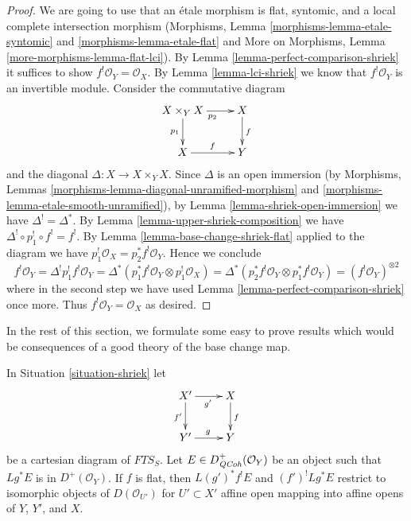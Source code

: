 \begin{proof}
We are going to use that an \'etale morphism is flat, syntomic,
and a local complete intersection morphism
(Morphisms, Lemma \ref{morphisms-lemma-etale-syntomic} and
\ref{morphisms-lemma-etale-flat} and
More on Morphisms, Lemma \ref{more-morphisms-lemma-flat-lci}).
By Lemma \ref{lemma-perfect-comparison-shriek} it suffices
to show $f^!\mathcal{O}_Y = \mathcal{O}_X$.
By Lemma \ref{lemma-lci-shriek} we know that $f^!\mathcal{O}_Y$
is an invertible module. Consider the commutative diagram
$$
\xymatrix{
X \times_Y X \ar[r]_{p_2} \ar[d]_{p_1} & X \ar[d]^f \\
X \ar[r]^f & Y
}
$$
and the diagonal $\Delta : X \to X \times_Y X$. Since $\Delta$
is an open immersion (by Morphisms, Lemmas
\ref{morphisms-lemma-diagonal-unramified-morphism} and
\ref{morphisms-lemma-etale-smooth-unramified}), by
Lemma \ref{lemma-shriek-open-immersion} we have $\Delta^! = \Delta^*$.
By Lemma \ref{lemma-upper-shriek-composition} we have
$\Delta^! \circ p_1^! \circ f^! = f^!$.
By Lemma \ref{lemma-base-change-shriek-flat} applied to
the diagram we have $p_1^!\mathcal{O}_X = p_2^*f^!\mathcal{O}_Y$.
Hence we conclude
$$
f^!\mathcal{O}_Y = \Delta^!p_1^!f^!\mathcal{O}_Y =
\Delta^*(p_1^*f^!\mathcal{O}_Y \otimes p_1^!\mathcal{O}_X) =
\Delta^*(p_2^*f^!\mathcal{O}_Y \otimes p_1^*f^!\mathcal{O}_Y) =
(f^!\mathcal{O}_Y)^{\otimes 2}
$$
where in the second step we have used
Lemma \ref{lemma-perfect-comparison-shriek} once more.
Thus $f^!\mathcal{O}_Y = \mathcal{O}_X$ as desired.
\end{proof}


\noindent
In the rest of this section, we formulate some easy to prove
results which would be consequences of a good theory of the
base change map.

\begin{lemma}
\label{lemma-base-change-locally}
In Situation \ref{situation-shriek} let
$$
\xymatrix{
X' \ar[r]_{g'} \ar[d]_{f'} & X \ar[d]^f \\
Y' \ar[r]^g & Y
}
$$
be a cartesian diagram of $\textit{FTS}_S$.
Let $E \in D^+_{\mathit{QCoh}}(\mathcal{O}_Y)$ be an object
such that $Lg^*E$ is in $D^+(\mathcal{O}_Y)$.
If $f$ is flat, then $L(g')^*f^!E$ and $(f')^!Lg^*E$
restrict to isomorphic objects of $D(\mathcal{O}_{U'})$
for $U' \subset X'$ affine open mapping into affine opens of $Y$, $Y'$, and $X$.
\end{lemma}

